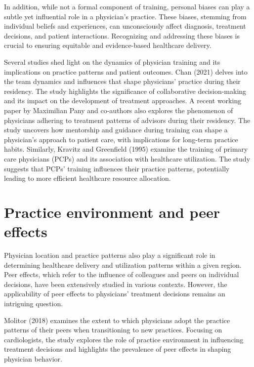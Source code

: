 \documentclass[
  letterpaper,
  DIV=11,
  numbers=noendperiod]{scrreport}
\theoremstyle{definition}
\theoremstyle{remark}
\begin{document}
In addition, while not a formal component of training, personal biases
can play a subtle yet influential role in a physician's practice. These
biases, stemming from individual beliefs and experiences, can
unconsciously affect diagnosis, treatment decisions, and patient
interactions. Recognizing and addressing these biases is crucial to
ensuring equitable and evidence-based healthcare delivery.

Several studies shed light on the dynamics of physician training and its
implications on practice patterns and patient outcomes. Chan (2021)
delves into the team dynamics and influences that shape physicians'
practice during their residency. The study highlights the significance
of collaborative decision-making and its impact on the development of
treatment approaches. A recent working paper by Maximilian Pany and
co-authors also explores the phenomenon of physicians adhering to
treatment patterns of advisors during their residency. The study
uncovers how mentorship and guidance during training can shape a
physician's approach to patient care, with implications for long-term
practice habits. Similarly, Kravitz and Greenfield (1995) examine the
training of primary care physicians (PCPs) and its association with
healthcare utilization. The study suggests that PCPs' training
influences their practice patterns, potentially leading to more
efficient healthcare resource allocation.

\hypertarget{practice-environment-and-peer-effects}{%
\section{Practice environment and peer
effects}\label{practice-environment-and-peer-effects}}

Physician location and practice patterns also play a significant role in
determining healthcare delivery and utilization patterns within a given
region. Peer effects, which refer to the influence of colleagues and
peers on individual decisions, have been extensively studied in various
contexts. However, the applicability of peer effects to physicians'
treatment decisions remains an intriguing question.

Molitor (2018) examines the extent to which physicians adopt the
practice patterns of their peers when transitioning to new practices.
Focusing on cardiologists, the study explores the role of practice
environment in influencing treatment decisions and highlights the
prevalence of peer effects in shaping physician behavior.
\end{document}
